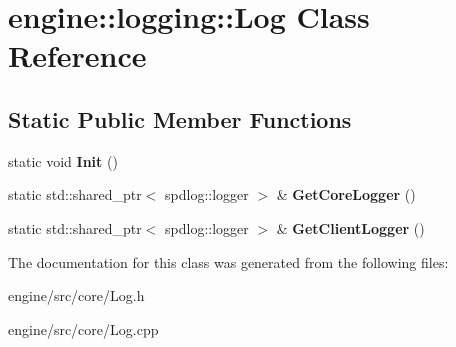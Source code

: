 \hypertarget{classengine_1_1logging_1_1Log}{}\section{engine\+:\+:logging\+:\+:Log Class Reference}
\label{classengine_1_1logging_1_1Log}
\subsection*{Static Public Member Functions}
\begin{DoxyCompactItemize}
\item
\mbox{\label{classengine_1_1logging_1_1Log_a1364bca4f007e2931a0110f91e3e13c4}}
static void {\bfseries Init} ()
\item
\mbox{\label{classengine_1_1logging_1_1Log_ad54813613a17e01d3272b9fb124b049e}}
static std\+::shared\+\_\+ptr$<$ spdlog\+::logger $>$ \& {\bfseries Get\+Core\+Logger} ()
\item
\mbox{\label{classengine_1_1logging_1_1Log_abae59faa07a4ce0d627772e79073c67b}}
static std\+::shared\+\_\+ptr$<$ spdlog\+::logger $>$ \& {\bfseries Get\+Client\+Logger} ()
\end{DoxyCompactItemize}


The documentation for this class was generated from the following files\+:\begin{DoxyCompactItemize}
\item
engine/src/core/Log.\+h\item
engine/src/core/Log.\+cpp\end{DoxyCompactItemize}

